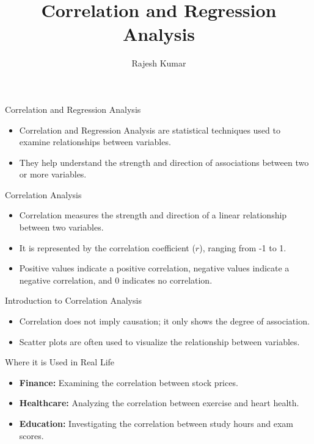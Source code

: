 \title{Correlation and Regression Analysis}
\author{Rajesh Kumar}
\date{}

\begin{frame}
  \titlepage
\end{frame}

\begin{frame}{Correlation and Regression Analysis}
  \begin{itemize}
    \item Correlation and Regression Analysis are statistical techniques used to examine relationships between variables.
    \item They help understand the strength and direction of associations between two or more variables.
  \end{itemize}
\end{frame}

\begin{frame}{Correlation Analysis}
  \begin{itemize}
    \item Correlation measures the strength and direction of a linear relationship between two variables.
    \item It is represented by the correlation coefficient (\(r\)), ranging from -1 to 1.
    \item Positive values indicate a positive correlation, negative values indicate a negative correlation, and 0 indicates no correlation.
  \end{itemize}
\end{frame}

\begin{frame}{Introduction to Correlation Analysis}
  \begin{itemize}
    \item Correlation does not imply causation; it only shows the degree of association.
    \item Scatter plots are often used to visualize the relationship between variables.
  \end{itemize}
\end{frame}

\begin{frame}{Where it is Used in Real Life}
  \begin{itemize}
    \item \textbf{Finance:} Examining the correlation between stock prices.
    \item \textbf{Healthcare:} Analyzing the correlation between exercise and heart health.
    \item \textbf{Education:} Investigating the correlation between study hours and exam scores.
  \end{itemize}
\end{frame}


